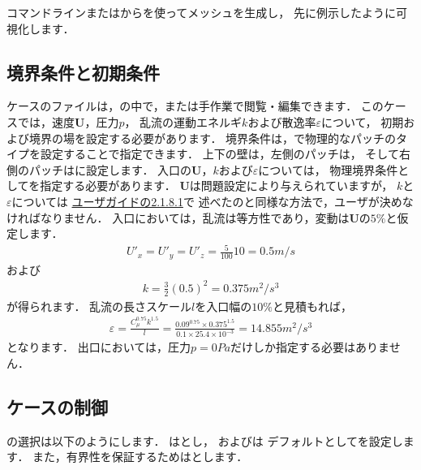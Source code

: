コマンドラインまたはからを使ってメッシュを生成し，
先に例示したように可視化します．


\subsection{境界条件と初期条件}
\label{ssec:3.2.3}
ケースのファイルは，の中で，または手作業で閲覧・編集できます．
このケースでは，速度$\bm{U}$，圧力$p$，
乱流の運動エネルギ$k$および散逸率$\varepsilon$について，
初期および境界の場を設定する必要があります．
境界条件は，で物理的なパッチのタイプを設定することで指定できます．
上下の壁は，左側のパッチは，
そして右側のパッチはに設定します．
入口の$\bm{U}$，$k$および$\varepsilon$については，
物理境界条件としてを指定する必要があります．
$\bm{U}$は問題設定により与えられていますが，
$k$と$\varepsilon$については
\href{UserGuideJa.pdf#subsubsection.2.1.8.1}{ユーザガイドの2.1.8.1}で
述べたのと同様な方法で，ユーザが決めなければなりません．
入口においては，乱流は等方性であり，変動は$\bm{U}$の$5\unit{\%}$と仮定します．
\begin{align}
 \label{eq:3.5}
 U'_{x} = U'_{y} = U'_{z} = \frac{5}{100}10 = 0.5 \unit{m/s}
\end{align}
および
\begin{align}
 \label{eq:3.6}
 k = \frac{3}{2}(0.5)^{2} = 0.375 \unit{m^{2}/s^{3}}
\end{align}
が得られます．
乱流の長さスケール$l$を入口幅の$10\unit{\%}$と見積もれば，
\begin{align}
 \label{eq:3.7}
 \varepsilon = \frac{C_{\mu}^{0.75}k^{1.5}}{l}
 = \frac{0.09^{0.75} \times 0.375^{1.5}}{0.1 \times 25.4 \times 10^{-3}}
 = 14.855 \unit{m^{2}/s^{3}}
\end{align}
となります．
出口においては，圧力$p = 0 \unit{Pa}$だけしか指定する必要はありません．


\subsection{ケースの制御}
\label{ssec:3.2.4}
の選択は以下のようにします．
はとし，
およびは
デフォルトとしてを設定します．
また，有界性を保証するためはとします．


